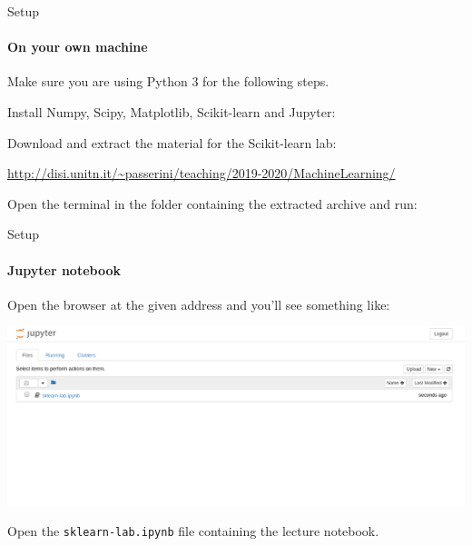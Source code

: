\documentclass{beamer}
\begin{document}
\begin{frame}{Setup}
\framesubtitle{On your own machine}
\centering

Make sure you are using Python 3 for the following steps.

\vspace{0.1in}

Install Numpy, Scipy, Matplotlib, Scikit-learn and Jupyter:
\pipinstall


Download and extract the material for the Scikit-learn lab:

\vspace{0.2in}

{\footnotesize \scriptsize \url{http://disi.unitn.it/~passerini/teaching/2019-2020/MachineLearning/}}

Open the terminal in the folder containing the extracted archive and run:
\launchjupyter

\end{frame}


\begin{frame}{Setup}
\framesubtitle{Jupyter notebook}
\centering

Open the browser at the given address and you'll see something like:

\vspace{0.2in}
\includegraphics[width=\textwidth]{figures/home}

\vspace{-0.8in}

Open the \texttt{sklearn-lab.ipynb} file containing the lecture notebook.

\end{frame}

\end{document}
